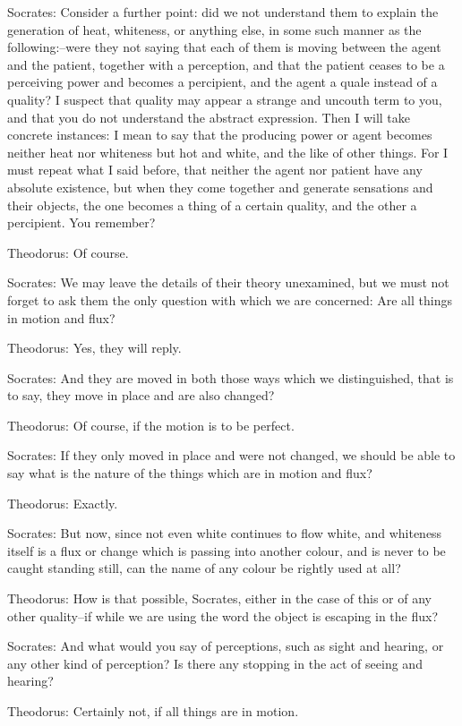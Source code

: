 Socrates: Consider a further point: did we not understand them to
explain the generation of heat, whiteness, or anything else, in some
such manner as the following:--were they not saying that each of them
is moving between the agent and the patient, together with a perception,
and that the patient ceases to be a perceiving power and becomes a
percipient, and the agent a quale instead of a quality? I suspect that
quality may appear a strange and uncouth term to you, and that you
do not understand the abstract expression. Then I will take concrete
instances: I mean to say that the producing power or agent becomes
neither heat nor whiteness but hot and white, and the like of other
things. For I must repeat what I said before, that neither the agent
nor patient have any absolute existence, but when they come together
and generate sensations and their objects, the one becomes a thing of a
certain quality, and the other a percipient. You remember?

Theodorus: Of course.

Socrates: We may leave the details of their theory unexamined, but
we must not forget to ask them the only question with which we are
concerned: Are all things in motion and flux?

Theodorus: Yes, they will reply.

Socrates: And they are moved in both those ways which we distinguished,
that is to say, they move in place and are also changed?

Theodorus: Of course, if the motion is to be perfect.

Socrates: If they only moved in place and were not changed, we should
be able to say what is the nature of the things which are in motion and
flux?

Theodorus: Exactly.

Socrates: But now, since not even white continues to flow white, and
whiteness itself is a flux or change which is passing into another
colour, and is never to be caught standing still, can the name of any
colour be rightly used at all?

Theodorus: How is that possible, Socrates, either in the case of this
or of any other quality--if while we are using the word the object is
escaping in the flux?

Socrates: And what would you say of perceptions, such as sight and
hearing, or any other kind of perception? Is there any stopping in the
act of seeing and hearing?

Theodorus: Certainly not, if all things are in motion.

